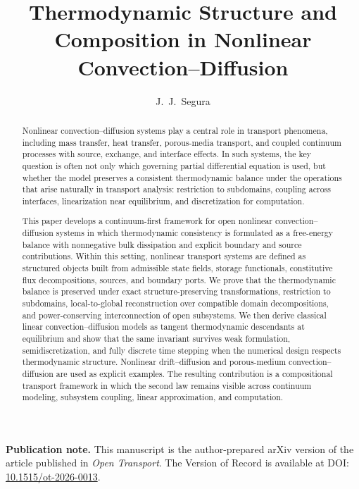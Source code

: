 \documentclass[11pt]{article}
\begin{document}
\title{Thermodynamic Structure and Composition in Nonlinear Convection--Diffusion}

\author{J.\ J.\ Segura}
\date{}

\maketitle

\noindent\textbf{Publication note.}
This manuscript is the author-prepared arXiv version of the article published in \textit{Open Transport}. The Version of Record is available at DOI: \href{https://doi.org/10.1515/ot-2026-0013}{10.1515/ot-2026-0013}.

\medskip

\begin{abstract}
Nonlinear convection--diffusion systems play a central role in transport phenomena,
including mass transfer, heat transfer, porous-media transport, and coupled continuum
processes with source, exchange, and interface effects. In such systems, the key
question is often not only which governing partial differential equation is used, but
whether the model preserves a consistent thermodynamic balance under the operations
that arise naturally in transport analysis: restriction to subdomains, coupling
across interfaces, linearization near equilibrium, and discretization for
computation.

This paper develops a continuum-first framework for open nonlinear
convection--diffusion systems in which thermodynamic consistency is formulated as a
free-energy balance with nonnegative bulk dissipation and explicit boundary and source
contributions. Within this setting, nonlinear transport systems are defined as
structured objects built from admissible state fields, storage functionals,
constitutive flux decompositions, sources, and boundary ports. We prove that the
thermodynamic balance is preserved under exact structure-preserving transformations,
restriction to subdomains, local-to-global reconstruction over compatible domain
decompositions, and power-conserving interconnection of open subsystems. We then
derive classical linear convection--diffusion models as tangent thermodynamic
descendants at equilibrium and show that the same invariant survives weak
formulation, semidiscretization, and fully discrete time stepping when the numerical
design respects thermodynamic structure. Nonlinear drift--diffusion and porous-medium
convection--diffusion are used as explicit examples. The resulting contribution is a
compositional transport framework in which the second law remains visible across
continuum modeling, subsystem coupling, linear approximation, and computation.
\end{abstract}
\end{document}
